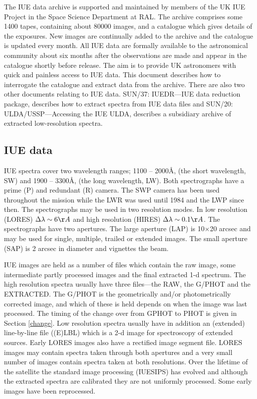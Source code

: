 The IUE data archive is supported and maintained by members of the UK IUE 
Project in the Space Science Department at RAL. 
The archive comprises some 1400 tapes, containing about 80000 images,
and a catalogue which gives details of the exposures. New images are continually
added to the archive and the catalogue is updated every month.
All IUE data are formally 
available to the astronomical community about six months after
the observations are made and appear in the catalogue shortly
before release.
The aim is to provide UK astronomers with quick and painless 
access to IUE data.
This document describes how to interrogate the catalogue and extract data from
the archive. There are also two other documents relating to IUE data. SUN/37:
IUEDR---IUE data reduction package,
describes how to extract spectra from IUE data files and SUN/20:
ULDA/USSP---Accessing the IUE ULDA,
describes a subsidiary archive of extracted low-resolution spectra.

\subsection {IUE data}

IUE spectra cover two wavelength ranges; 1100 -- 2000\AA, (the short wavelength,
SW)
and 1900 -- 3300\AA, (the long wavelength, LW).
Both spectrographs have a prime (P) and redundant (R) camera. The SWP camera
has been used throughout the mission while the LWR was used until 1984 and
the LWP since then.
The spectrographs may be used in two resolution modes.
In low resolution (LORES) $\Delta\lambda\sim6\AA$ and high resolution (HIRES)
$\Delta\lambda\sim0.1\AA$.
The spectrographs have two apertures. The 
large aperture (LAP) is 10$\times$20 arcsec and may be used for single,
multiple, trailed or extended images. The small aperture (SAP) is 2 arcsec
in diameter and vignettes the beam.

IUE images are held as a number of files which contain the raw image, some
intermediate partly processed images and the final extracted 1-d spectrum. The
high resolution spectra usually have three files---the RAW, the G/PHOT and the
EXTRACTED. 
The G/PHOT is the geometrically and/or photometrically corrected image, and
which of these is held depends on when the image was last processed. The 
timing of the change over from GPHOT to PHOT is given in Section \ref{change}.
Low resolution spectra 
usually have in addition an (extended) line-by-line file ((E)LBL) 
which is a 2-d image for spectroscopy of extended sources. Early LORES images
also have a rectified image segment file.
LORES images may contain spectra taken through both apertures and a very small
number of images contain spectra taken at both resolutions.
Over the lifetime of the satellite the standard image processing (IUESIPS)
has evolved and although the extracted spectra are calibrated they are not
uniformly processed. Some early images have been reprocessed.

